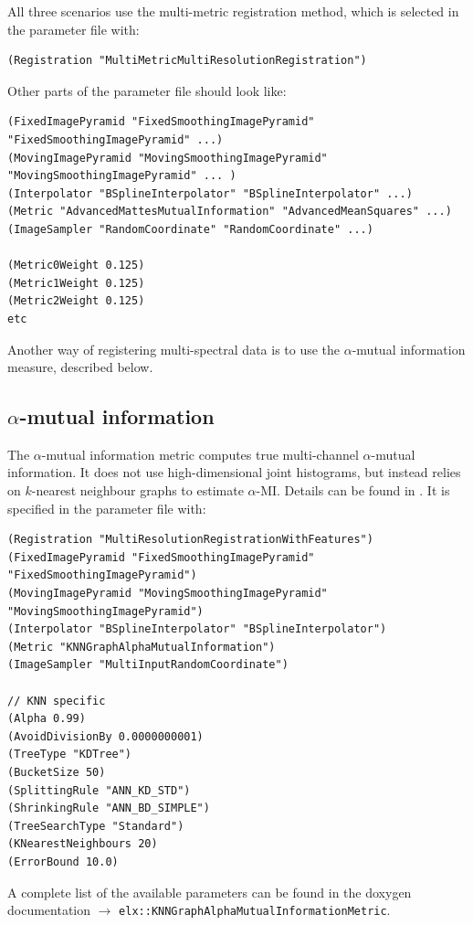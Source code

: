 \documentclass[]{report}
\begin{document}
All three scenarios use the multi-metric registration method, which
is selected in the parameter file with:
\small
\begin{verbatim}
(Registration "MultiMetricMultiResolutionRegistration")
\end{verbatim}
\normalsize Other parts of the parameter file should look like:
\small
\begin{verbatim}
(FixedImagePyramid "FixedSmoothingImagePyramid" "FixedSmoothingImagePyramid" ...)
(MovingImagePyramid "MovingSmoothingImagePyramid" "MovingSmoothingImagePyramid" ... )
(Interpolator "BSplineInterpolator" "BSplineInterpolator" ...)
(Metric "AdvancedMattesMutualInformation" "AdvancedMeanSquares" ...)
(ImageSampler "RandomCoordinate" "RandomCoordinate" ...)

(Metric0Weight 0.125)
(Metric1Weight 0.125)
(Metric2Weight 0.125)
etc
\end{verbatim}
\normalsize

Another way of registering multi-spectral data is to use the
$\alpha$-mutual information measure, described below.

\subsection{$\alpha$-mutual information}

The $\alpha$-mutual information metric computes true multi-channel
$\alpha$-mutual information. It does not use high-dimensional joint
histograms, but instead relies on $k$-nearest neighbour graphs to
estimate $\alpha$-MI. Details can be found in \cite{Staring09}. It
is specified in the parameter file with: \small
\begin{verbatim}
(Registration "MultiResolutionRegistrationWithFeatures")
(FixedImagePyramid "FixedSmoothingImagePyramid" "FixedSmoothingImagePyramid")
(MovingImagePyramid "MovingSmoothingImagePyramid" "MovingSmoothingImagePyramid")
(Interpolator "BSplineInterpolator" "BSplineInterpolator")
(Metric "KNNGraphAlphaMutualInformation")
(ImageSampler "MultiInputRandomCoordinate")

// KNN specific
(Alpha 0.99)
(AvoidDivisionBy 0.0000000001)
(TreeType "KDTree")
(BucketSize 50)
(SplittingRule "ANN_KD_STD")
(ShrinkingRule "ANN_BD_SIMPLE")
(TreeSearchType "Standard")
(KNearestNeighbours 20)
(ErrorBound 10.0)
\end{verbatim}
\normalsize A complete list of the available parameters can be found in the
doxygen documentation $\rightarrow$ \linebreak
\texttt{elx::KNNGraphAlphaMutualInformationMetric}.
\end{document}

